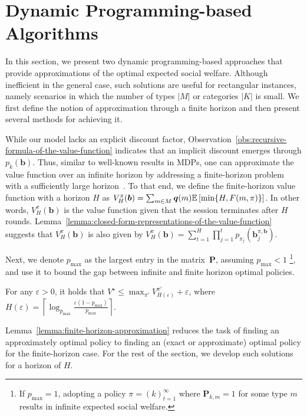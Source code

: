 \section{Dynamic Programming-based Algorithms}%
\label{sec:approximating-the-optimal-policy}

In this section, we present two dynamic programming-based approaches that provide approximations of the optimal expected social welfare. Although inefficient in the general case, such solutions are useful for rectangular instances, namely scenarios in which the number of types $|M|$ or categories $|K|$ is small. We first define the notion of approximation through a finite horizon and then present several methods for achieving it.

While our model lacks an explicit discount factor, Observation~\ref{obs:recursive-formula-of-the-value-function} indicates that an implicit discount emerges through $p_{k}(\bm{b})$. Thus, similar to well-known results in MDPs, one can approximate the value function over an infinite horizon by addressing a finite-horizon problem with a sufficiently large horizon~\citep[Sec.~17.2]{ai-a-modern-approach}. To that end, we define the finite-horizon value function with a horizon $H$ as $V_H^{\pi}(\bm{b})=\sum_{m \in M}\bm q(m)\mathbb{E}\left[ \min \{H, F(m,\pi)\} \right]$. In other words, $V_H^{\pi}(\bm{b})$ is the value function given that the session terminates after $H$ rounds. Lemma~\ref{lemma:closed-form-representations-of-the-value-function} suggests that $V_H^{\pi}(\bm{b})$ is also given by $V_H^{\pi}(\bm{b}) = \sum_{t=1}^{H} \prod_{j=1}^{t} p_{\pi_{j}}(\bm{b}^{\pi, \bm{b}}_j)$.

Next, we denote $p_{\max}$ as the largest entry in the matrix~$\bm P$, assuming $p_{\max} < 1$ \footnote{If \( p_{\max} = 1 \), adopting a policy \( \pi = (k)_{t=1}^\infty \) where \( \bm{P}_{k,m} = 1 \) for some type \( m \) results in infinite expected social welfare.}, and use it to bound the gap between infinite and finite horizon optimal policies.
\begin{lemma} \label{lemma:finite-horizon-approximation}
 For any $\varepsilon >0$, it holds that $V^{\star} \leq \max_{\pi'} V_{H(\varepsilon)}^{\pi'}+ \varepsilon$, where 
 $H(\varepsilon) = \left\lceil \log_{p_{\max}} \frac{\varepsilon (1 - p_{\max})}{p_{\max}} \right\rceil$.
\end{lemma}
Lemma~\ref{lemma:finite-horizon-approximation} reduces the task of finding an approximately optimal policy to finding an (exact or approximate) optimal policy for the finite-horizon case. For the rest of the section, we develop such solutions for a horizon of $H$.
